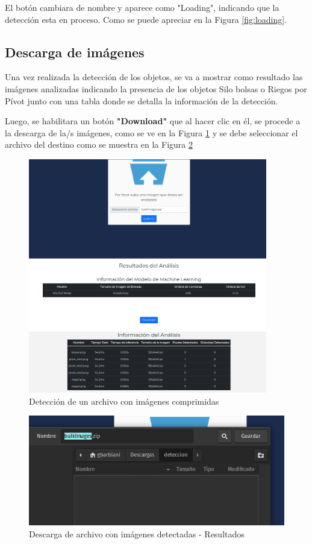 El botón cambiara de nombre y aparece como "Loading", indicando que la detección esta en proceso. Como se puede apreciar en la Figura \ref{fig:loading}.


\subsection{Descarga de imágenes}

Una vez realizada la detección de los objetos, se va a mostrar como resultado las imágenes analizadas indicando la presencia de los objetos Silo bolsas o Riegos por Pívot junto con una tabla donde se detalla la información de la detección.

Luego, se habilitara un botón \textbf{"Download"} que al hacer clic en él, se procede a la descarga de la/s imágenes, como se ve en la Figura \ref{fig:bulk detection} y se debe seleccionar el archivo del destino como se muestra en la Figura \ref{fig:download file}

\begin{figure}[h!]
    \centering
    \includegraphics[width=0.93\textwidth]{img/FE - bulk detection.png}
    \caption{Detección de un archivo con imágenes comprimidas}
    \label{fig:bulk detection}
\end{figure}

\begin{figure}[h!]
\centering
    \includegraphics[width=1\textwidth]{img/FE - download file.png}
    \caption{Descarga de archivo con imágenes detectadas - Resultados}
    \label{fig:download file}
\end{figure}


